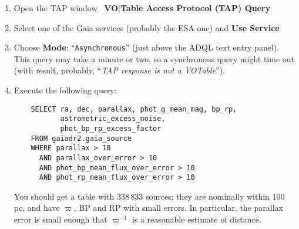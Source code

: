 \documentclass{article}
\newcommand{\buttimg}[1]
           {\mbox{\vtop{\vskip-2ex\hbox{\texttt{[image: \#1]}}}}}
\newcommand{\lab}[1]{{\bf #1}}
\newcommand{\mb}[3]{\buttimg{#1}~\lab{#2}$\mid$\lab{#3}}
\newcommand{\entry}[2]{\lab{#1}: ``{\tt #2}''}
\begin{document}
\begin{minipage}[t]{11cm}
  \raggedright
  \begin{enumerate}
  \item Open the TAP window
        \mb{tap_button.png}{VO}{Table Access Protocol (TAP) Query}
  \item Select one of the Gaia services (probably the ESA one)
        and \lab{Use Service}
  \item Choose \entry{Mode}{Asynchronous}
        (just above the ADQL text entry panel).
        This query may take a minute or two,
        so a synchronous query might time out
        (with result, probably, ``{\em TAP response is not a VOTable}'').
  \item Execute the following query:
\label{step:hrd-data}
    \begin{verbatim}
    SELECT ra, dec, parallax, phot_g_mean_mag, bp_rp,
           astrometric_excess_noise,
           phot_bp_rp_excess_factor
    FROM gaiadr2.gaia_source
    WHERE parallax > 10
      AND parallax_over_error > 10
      AND phot_bp_mean_flux_over_error > 10
      AND phot_rp_mean_flux_over_error > 10
    \end{verbatim}
    \vspace*{-3ex}
    You should get a table with 338\,833 sources;
    they are nominally within 100\,pc, and have $\varpi$, BP and RP
    with small errors.  In particular, the parallax error is small enough
    that $\varpi^{-1}$ is a reasonable estimate of distance.
  \end{enumerate}
\end{minipage}
\end{document}
